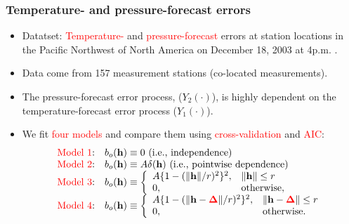 \documentclass{beamer}
\newcommand{\Deltab} {\boldsymbol{\Delta}}
\newcommand{\h}{\mathbf{h}}
\newcommand{\red}{\textcolor{red}}%
\begin{document}
\begin{frame}
\frametitle{Temperature- and pressure-forecast errors}

\begin{itemize}
\item Datatset: \textcolor{red}{Temperature-} and \textcolor{red}{pressure-forecast} errors at station locations in the Pacific Northwest of North America on December 18, 2003 at 4p.m. \citep{Gneitingetal2010}.
\item Data come from 157 measurement stations (co-located measurements).
\item The pressure\hyp{}forecast error process, ($Y_2(\cdot)$), is highly dependent on the temperature\hyp{}forecast error process ($Y_1(\cdot)$).
\item We fit \textcolor{red}{four models} and compare them using \red{cross-validation} and \textcolor{red}{AIC}:
\begin{equation*}
\begin{array}{ll}
\textrm{\textcolor{red}{Model 1}:} &b_o(\h) \equiv 0 \mbox{ (i.e., independence)}\\
\textrm{\textcolor{red}{Model 2}:} &b_o(\h) \equiv A\delta(\h) \mbox{ (i.e., pointwise dependence)}\\
\textrm{\textcolor{red}{Model 3}:} &b_o(\h) \equiv \left\{\begin{array}{ll} A\{1 - (\|\h \|/r)^2\}^2, & \| \h\| \le r \\ 0, & \textrm{otherwise}, \end{array} \right. \\
\textrm{\textcolor{red}{Model 4}:} &b_o(\h) \equiv \left\{\begin{array}{ll} A\{1 - (\|\h - \textcolor{red}{\Deltab}\|/r)^2\}^2, & \| \h - \textcolor{red}{\Deltab}\| \le r \\ 0, & \textrm{otherwise}. \end{array} \right.
\end{array}
\end{equation*}
\end{itemize}
\end{frame}

\end{document}
